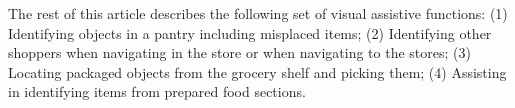 

The rest of this article describes the following set of visual assistive
functions: (1) Identifying objects in a pantry including misplaced
items; (2) Identifying other shoppers when navigating in the store or
when navigating to the stores; (3) Locating packaged objects from the
grocery shelf and picking them; (4) Assisting in identifying items
from prepared food sections.

